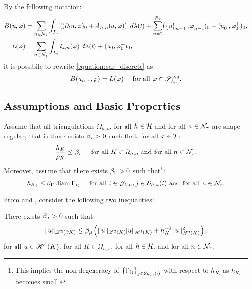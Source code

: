 By the following notation:
\begin{align}
    B(u, \varphi) &= \sum_{n \in \mathcal{N}_{\tau}} \int_{I_n} \left( (\partial_t u, \varphi )_0 + A_{h, n}(u, \varphi) \right) ~ d \lambda(t) + \sum_{n = 2}^{N_{\tau}} (\left\{ u \right\}_{n - 1}, \varphi_{n - 1}^+ )_0 + (u_0^+, \varphi_0^+ )_0, \label{equation:cdr_B} \\
    L(\varphi) &= \sum_{n \in \mathcal{N}_{\tau}} \int_{I_n} l_{h, n}(\varphi) ~ d \lambda(t) + (u_0, \varphi_0^+ )_0 \label{equation:cdr_L},
\end{align}
it is possibile to rewrite \eqref{equation:cdr_discrete} as:
\begin{gather}
    B(u_{h, \tau}, \varphi) = L(\varphi) \quad \text{ for all } \varphi \in \mathscr{S}_{h, \tau}^{p, q}. \label{equation:cdr_discrete_short}
\end{gather}

\newpage
\subsection{Assumptions and Basic Properties}

Assume that all triangulations $\Omega_{h, n}$, for all $h \in \mathcal{H}$ and for all $n \in \mathcal{N}_{\tau}$ are shape-regular, that is there exists $\beta_{\tau} > 0$ such that, for all $\tau \in \mathcal{T}$:
\begin{gather}
    \frac{h_K}{\rho_K} \leq \beta_{\tau} \quad \text{ for all } K \in \Omega_{h, n} \text{ and for all } n \in \mathcal{N}_{\tau}.
\end{gather}
Moreover, assume that there exists $\beta_{\Gamma} > 0$ such that\footnote{This implies the non-degeneracy of $\left\{ \Gamma_{ij} \right\}_{j \in \mathcal{S}_{h, n}(i)}$ with respect to $h_{K_i}$ as $h_{K_i}$ becomes small.}:
\begin{gather}
    h_{K_i} \leq \beta_{\Gamma} \operatorname*{diam} \Gamma_{ij} \quad \text{ for all } i \in \mathcal{J}_{h, n}, j \in \mathcal{S}_{h, n}(i) \text{ and for all } n \in \mathcal{N}_{\tau}.
\end{gather}

From \cite{Dolejší2002} and \cite{Ciarlet1978}, consider the following two inequalities:

\begin{lemma}
    There exists $\beta_{\mu} > 0$ such that:
    \begin{gather}
        \lVert u \rVert_{\mathscr{L}^{2}(\partial K)} \leq \beta_{\mu} \left( \lVert u \rVert_{\mathscr{L}^{2}(K)} \lvert u \rvert_{\mathscr{H}^{1}(K)} + h_K^{-1} \lVert u \rVert_{\mathscr{L}^{2}(K)}^2 \right),
    \end{gather}
    for all $u \in \mathscr{H}^{1}(K)$, for all $K \in \Omega_{h, n}$, for all $h \in \mathcal{H}$, and for all $n \in \mathcal{N}_{\tau}$.
\end{lemma}

